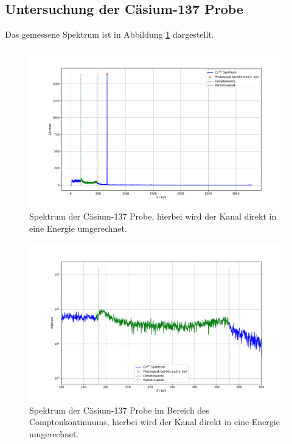 \subsection{Untersuchung der Cäsium-137 Probe}
Das gemessene Spektrum ist in Abbildung \ref{fig:Cs137} dargestellt.
\FloatBarrier
\begin{figure}
  \centering
  \caption{Spektrum der Cäsium-137 Probe, hierbei wird der Kanal direkt in eine Energie umgerechnet.}
  \label{fig:Cs137}
  \includegraphics[width= \textwidth,keepaspectratio]{figure/02_peaks.pdf}
\end{figure}
\begin{figure}
\centering
\caption{Spektrum der Cäsium-137 Probe im Bereich des Comptonkontinuums, hierbei wird der Kanal direkt in eine Energie umgerechnet.}
\label{fig:Cs137_log}
\includegraphics[width= \textwidth,keepaspectratio]{figure/02_peaks_Log.pdf}
\end{figure}


